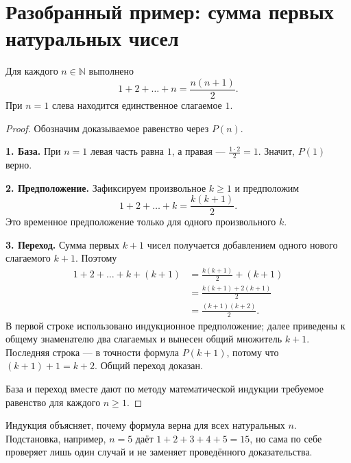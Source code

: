\Needspace{.85\textheight}
\section*{Разобранный пример: сумма первых натуральных чисел}

\begin{theorem}
Для каждого \(n\in\mathbb N\) выполнено
\[
1+2+\dots+n=\frac{n(n+1)}2.
\]
При \(n=1\) слева находится единственное слагаемое \(1\).
\end{theorem}

\begin{proof}
Обозначим доказываемое равенство через \(P(n)\).

\textbf{1. База.} При \(n=1\) левая часть равна \(1\), а правая ---
\(\frac{1\cdot2}{2}=1\). Значит, \(P(1)\) верно.

\textbf{2. Предположение.} Зафиксируем произвольное \(k\ge1\) и предположим
\[
1+2+\dots+k=\frac{k(k+1)}2.
\]
Это временное предположение только для одного произвольного \(k\).

\textbf{3. Переход.} Сумма первых \(k+1\) чисел получается добавлением
одного нового слагаемого \(k+1\). Поэтому
\[
\begin{aligned}
1+2+\dots+k+(k+1)
&=\frac{k(k+1)}2+(k+1)\\
&=\frac{k(k+1)+2(k+1)}2\\
&=\frac{(k+1)(k+2)}2.
\end{aligned}
\]
В первой строке использовано индукционное предположение; далее приведены к общему
знаменателю два слагаемых и вынесен общий множитель \(k+1\).
Последняя строка --- в точности формула \(P(k+1)\), потому что
\((k+1)+1=k+2\). Общий переход доказан.

База и переход вместе дают по методу математической индукции требуемое равенство
для каждого \(n\ge1\).
\end{proof}

Индукция объясняет, почему формула верна для всех натуральных \(n\).
Подстановка, например, \(n=5\) даёт \(1+2+3+4+5=15\), но сама по себе
проверяет лишь один случай и не заменяет проведённого доказательства.
